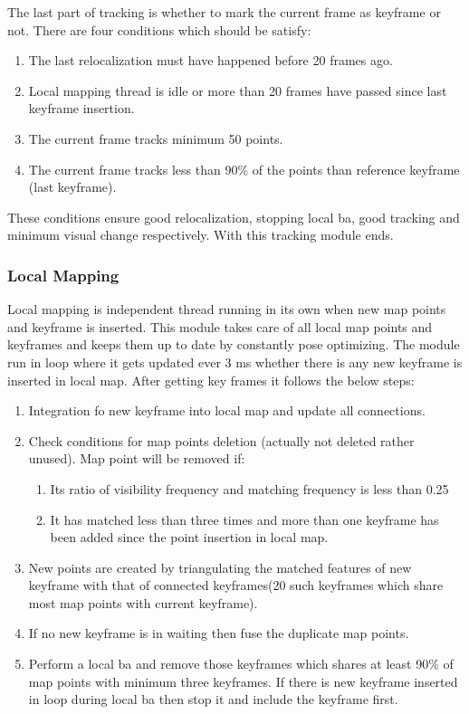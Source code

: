 \newline
The last part of tracking is whether to mark the current frame as keyframe or not. There are four conditions which should be satisfy:
\begin{enumerate}
	\item The last relocalization must have happened before 20 frames ago.
	\item Local mapping thread is idle or more than 20 frames have passed since last keyframe insertion.
	\item The current frame tracks minimum 50 points.
	\item The current frame tracks less than 90\% of the points than reference keyframe (last keyframe).
\end{enumerate}
These conditions ensure good relocalization, stopping local \acrshort{ba}, good tracking and minimum visual change respectively. With this tracking module ends. 

\subsubsection{Local Mapping} 
Local mapping is independent thread running in its own when new map points and keyframe is inserted. This module takes care of all local map points and keyframes and keeps them up to date by constantly pose optimizing. The module run in loop where it gets updated ever 3 ms whether there is any new keyframe is inserted in local map. After getting key frames it follows the below steps: 
\begin{enumerate}
	\item Integration fo new keyframe into local map and update all connections. 
	\item Check conditions for map points deletion (actually not deleted rather unused). Map point will be removed if: 
	   \begin{enumerate}
		\item Its ratio of visibility frequency and matching frequency is less than 0.25
		\item It has matched less than three times and more than one keyframe has been added since the point insertion in local map.
	   \end{enumerate}
	\item New points are created by triangulating the matched features of new keyframe with that of connected keyframes(20 such keyframes which share most map points with current keyframe).  
	\item If no new keyframe is in waiting then fuse the duplicate map points.
	\item Perform a local \acrshort{ba} and remove those keyframes which shares at least 90\% of map points with minimum three keyframes. If there is new keyframe inserted in loop during local \acrshort{ba} then stop it and include the keyframe first.
\end{enumerate}

